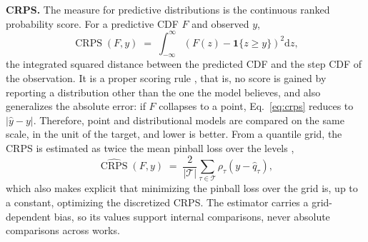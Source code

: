 \textbf{CRPS.} The measure for predictive distributions is the
continuous ranked probability score. For a predictive CDF $F$ and observed $y$,
\begin{equation}
  \operatorname{CRPS}(F, y) \;=\;
  \int_{-\infty}^{\infty}
  \left( F(z) - \mathbf{1}\{z \geq y\} \right)^2 \mathrm{d}z,
  \label{eq:crps}
\end{equation}
the integrated squared distance between the predicted CDF
and the step CDF of the observation. It is a proper scoring rule \citep{gneiting2007}, that is, no score is gained by reporting a
distribution other than the one the model believes, and also generalizes the absolute error: if $F$ collapses to a point,
Eq.~\ref{eq:crps} reduces to $|\hat{y} - y|$. Therefore, point and
distributional models are compared on the same scale, in the unit of
the target, and lower is better. From a quantile grid, the CRPS is
estimated as twice the mean pinball loss over the levels
\citep{gneiting2011},
\begin{equation}
  \widehat{\operatorname{CRPS}}(F, y) \;=\;
  \frac{2}{|\mathcal{T}|} \sum_{\tau \in \mathcal{T}}
  \rho_\tau\!\left(y - \hat{q}_\tau\right),
  \label{eq:crps-grade}
\end{equation}
which also makes explicit that minimizing the pinball loss over the
grid is, up to a constant, optimizing the discretized CRPS. The
estimator carries a grid-dependent bias, so its values support internal comparisons, never absolute comparisons across
works.

